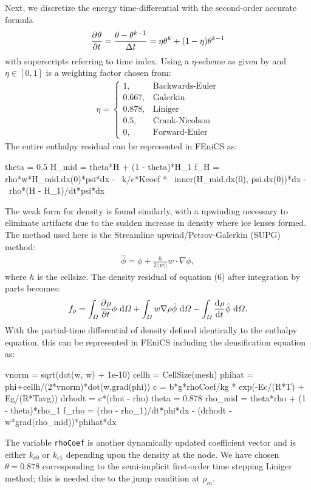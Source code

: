 Next, we discretize the energy time-differential with the second-order accurate formula
\begin{align*}
  \frac{\partial^{} \theta}{\partial t^{} } = \frac{\theta - \theta^{k-1}}{\Delta t} = \eta \theta^{k}  + (1-\eta) \theta^{k-1}
\end{align*}
with superscripts referring to time index.  Using a $\eta$-scheme as given by \citet{zienkiewicz_2005} and $\eta \in [0,1]$ is a weighting factor chosen from: 
\begin{align*}
    \eta = 
    \begin{cases}
      1,       & \text{Backwards-Euler}\\
      0.667,   & \text{Galerkin}\\
      0.878,   & \text{Liniger}\\
      0.5,     & \text{Crank-Nicolson}\\
      0,       & \text{Forward-Euler}
    \end{cases}
\end{align*}
The entire enthalpy residual can be represented in FEniCS as:\par
\begin{python}
theta = 0.5
H_mid = theta*H + (1 - theta)*H_1
f_H   = rho*w*H_mid.dx(0)*psi*dx - \
        k/c*Kcoef * \ 
        inner(H_mid.dx(0), psi.dx(0))*dx - \
        rho*(H - H_1)/dt*psi*dx
\end{python}

The weak form for density is found similarly, with a upwinding necessary to eliminate artifacts due to the sudden increase in density where ice lenses formed.  The method used here is the Streamline upwind/Petrov-Galerkin (SUPG) method:
\begin{align*}
    \hat{\phi} = \phi + \frac{h}{2||w||} w \cdot \nabla{\phi},
\end{align*}
where $h$ is the cellsize.  The density residual of equation (6) after integration by parts becomes:
\begin{align}
  f_{\rho} = 
    \int_{\varOmega} \frac{\partial^{} \rho}{\partial t^{} }\phi \ \mathrm{d}\varOmega + 
    \int_{\varOmega} w\nabla \rho \hat{\phi} \ \mathrm{d}\varOmega -
    \int_{\varOmega}\frac{\mathrm{d}^{} \rho}{\mathrm{d} t^{} }\hat{\phi} \ \mathrm{d}\varOmega.
\end{align}
With the partial-time differential of density defined identically to the enthalpy equation, this can be represented in FEniCS including the \citet{arthern_2010} densification equation as:\par
\begin{python}
vnorm   = sqrt(dot(w, w) + 1e-10)
cellh   = CellSize(mesh)
phihat  = phi+cellh/(2*vnorm)*dot(w,grad(phi))
c       = b*g*rhoCoef/kg * 
          exp(-Ec/(R*T) + Eg/(R*Tavg))
drhodt  = c*(rhoi - rho)
theta   = 0.878
rho_mid = theta*rho + (1 - theta)*rho_1
f_rho   = (rho - rho_1)/dt*phi*dx - 
          (drhodt - w*grad(rho_mid))*phihat*dx
\end{python}
The variable \texttt{rhoCoef} is another dynamically updated coefficient vector and is either $k_{c0}$ or $k_{c1}$ depending upon the density at the node.  We have chosen $\theta = 0.878$ corresponding to the semi-implicit first-order time stepping Liniger method; this is needed due to the jump condition at $\rho_m$.

